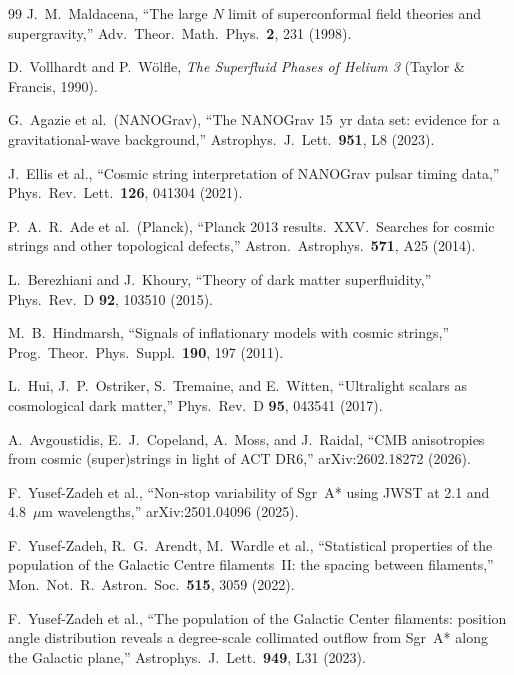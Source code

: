 \documentclass[11pt]{article}
\begin{document}
\begin{thebibliography}{99}
 J.~M.~Maldacena, ``The large $N$ limit of superconformal field theories and supergravity,'' Adv.\ Theor.\ Math.\ Phys.\ \textbf{2}, 231 (1998).

 D.~Vollhardt and P.~W\"olfle, \emph{The Superfluid Phases of Helium 3} (Taylor \& Francis, 1990).

 G.~Agazie et al.\ (NANOGrav), ``The NANOGrav 15~yr data set: evidence for a gravitational-wave background,'' Astrophys.\ J.\ Lett.\ \textbf{951}, L8 (2023).

 J.~Ellis et al., ``Cosmic string interpretation of NANOGrav pulsar timing data,'' Phys.\ Rev.\ Lett.\ \textbf{126}, 041304 (2021).

 P.~A.~R.~Ade et al.\ (Planck), ``Planck 2013 results.\ XXV.\ Searches for cosmic strings and other topological defects,'' Astron.\ Astrophys.\ \textbf{571}, A25 (2014).

 L.~Berezhiani and J.~Khoury, ``Theory of dark matter superfluidity,'' Phys.\ Rev.\ D \textbf{92}, 103510 (2015).

 M.~B.~Hindmarsh, ``Signals of inflationary models with cosmic strings,'' Prog.\ Theor.\ Phys.\ Suppl.\ \textbf{190}, 197 (2011).

 L.~Hui, J.~P.~Ostriker, S.~Tremaine, and E.~Witten, ``Ultralight scalars as cosmological dark matter,'' Phys.\ Rev.\ D \textbf{95}, 043541 (2017).

 A.~Avgoustidis, E.~J.~Copeland, A.~Moss, and J.~Raidal, ``CMB anisotropies from cosmic (super)strings in light of ACT DR6,'' arXiv:2602.18272 (2026).

 F.~Yusef-Zadeh et al., ``Non-stop variability of Sgr~A* using JWST at 2.1 and 4.8~$\mu$m wavelengths,'' arXiv:2501.04096 (2025).

 F.~Yusef-Zadeh, R.~G.~Arendt, M.~Wardle et al., ``Statistical properties of the population of the Galactic Centre filaments~II: the spacing between filaments,'' Mon.\ Not.\ R.\ Astron.\ Soc.\ \textbf{515}, 3059 (2022).

 F.~Yusef-Zadeh et al., ``The population of the Galactic Center filaments: position angle distribution reveals a degree-scale collimated outflow from Sgr~A* along the Galactic plane,'' Astrophys.\ J.\ Lett.\ \textbf{949}, L31 (2023).


\end{thebibliography}
\end{document}
